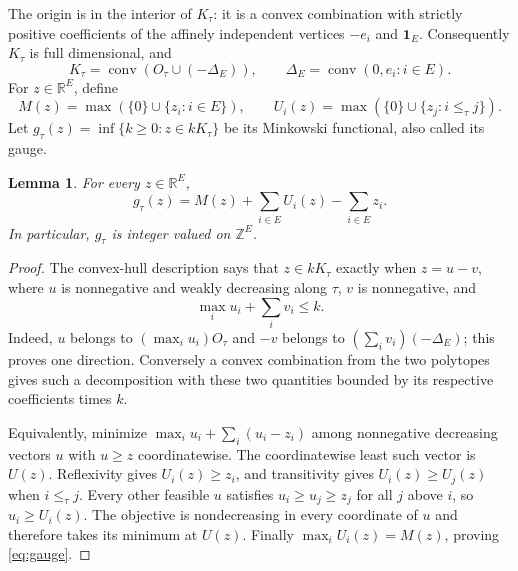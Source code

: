\documentclass[11pt]{article}
\newtheorem{lemma}{Lemma}
\newcommand{\Z}{\mathbb Z}
\newcommand{\R}{\mathbb R}
\newcommand{\one}{\mathbf1}
\begin{document}
The origin is in the interior of $K_\tau$: it is a convex
combination with strictly positive coefficients of the affinely
independent vertices $-e_i$ and $\one_E$. Consequently $K_\tau$
is full dimensional, and
\[
 K_\tau=\operatorname{conv}(O_\tau\cup(-\Delta_E)),
 \qquad \Delta_E=\operatorname{conv}(0,e_i:i\in E).
\]
For $z\in\R^E$, define
\[
 M(z)=\max(\{0\}\cup\{z_i:i\in E\}),\qquad
 U_i(z)=\max(\{0\}\cup\{z_j:i\le_\tau j\}).
\]
Let $g_\tau(z)=\inf\{k\ge0:z\in kK_\tau\}$ be its Minkowski
functional, also called its gauge.

\begin{lemma}\label{lem:gauge}
For every $z\in\R^E$,
\begin{equation}\label{eq:gauge}
 g_\tau(z)=M(z)+\sum_{i\in E}U_i(z)-\sum_{i\in E}z_i.
\end{equation}
In particular, $g_\tau$ is integer valued on $\Z^E$.
\end{lemma}
\begin{proof}
The convex-hull description says that $z\in kK_\tau$ exactly
when $z=u-v$, where $u$ is nonnegative and weakly decreasing
along $\tau$, $v$ is nonnegative, and
\[
 \max_i u_i+\sum_i v_i\le k.
\]
Indeed, $u$ belongs to $(\max_i u_i)O_\tau$ and $-v$ belongs
to $(\sum_i v_i)(-\Delta_E)$; this proves one direction.
Conversely a convex combination from the two polytopes gives
such a decomposition with these two quantities bounded by its
respective coefficients times $k$.

Equivalently, minimize $\max_i u_i+\sum_i(u_i-z_i)$ among
nonnegative decreasing vectors $u$ with $u\ge z$ coordinatewise.
The coordinatewise least such vector is $U(z)$. Reflexivity gives
$U_i(z)\ge z_i$, and transitivity gives $U_i(z)\ge U_j(z)$
when $i\le_\tau j$. Every other feasible $u$ satisfies
$u_i\ge u_j\ge z_j$ for all $j$ above $i$, so $u_i\ge U_i(z)$.
The objective is nondecreasing in every coordinate of $u$ and
therefore takes its minimum at $U(z)$. Finally
$\max_i U_i(z)=M(z)$, proving \eqref{eq:gauge}.
\end{proof}
\end{document}
